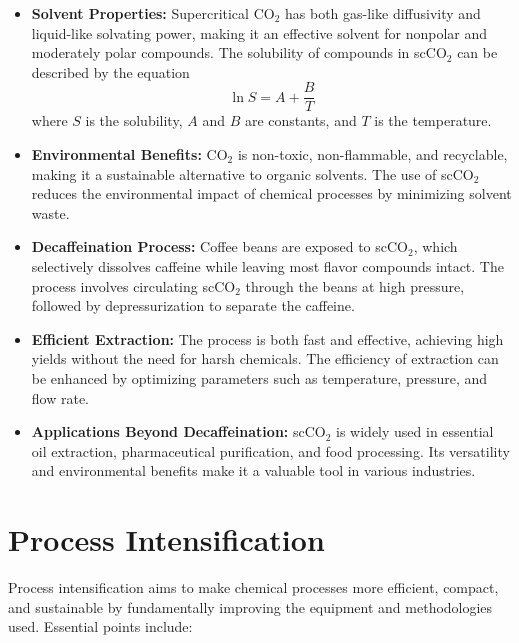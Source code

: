 \documentclass[11pt]{article}
\begin{document}
\begin{itemize}
    \item \textbf{Solvent Properties:} Supercritical CO$_2$ has both gas-like diffusivity and liquid-like solvating power, making it an effective solvent for nonpolar and moderately polar compounds. The solubility of compounds in scCO$_2$ can be described by the equation 
    \[
    \ln S = A + \frac{B}{T}
    \]
    where \( S \) is the solubility, \( A \) and \( B \) are constants, and \( T \) is the temperature.
    \item \textbf{Environmental Benefits:} CO$_2$ is non-toxic, non-flammable, and recyclable, making it a sustainable alternative to organic solvents. The use of scCO$_2$ reduces the environmental impact of chemical processes by minimizing solvent waste.
    \item \textbf{Decaffeination Process:} Coffee beans are exposed to scCO$_2$, which selectively dissolves caffeine while leaving most flavor compounds intact. The process involves circulating scCO$_2$ through the beans at high pressure, followed by depressurization to separate the caffeine.
    \item \textbf{Efficient Extraction:} The process is both fast and effective, achieving high yields without the need for harsh chemicals. The efficiency of extraction can be enhanced by optimizing parameters such as temperature, pressure, and flow rate.
    \item \textbf{Applications Beyond Decaffeination:} scCO$_2$ is widely used in essential oil extraction, pharmaceutical purification, and food processing. Its versatility and environmental benefits make it a valuable tool in various industries.
\end{itemize}

\section{Process Intensification}
Process intensification aims to make chemical processes more efficient, compact, and sustainable by fundamentally improving the equipment and methodologies used. Essential points include:
\end{document}
